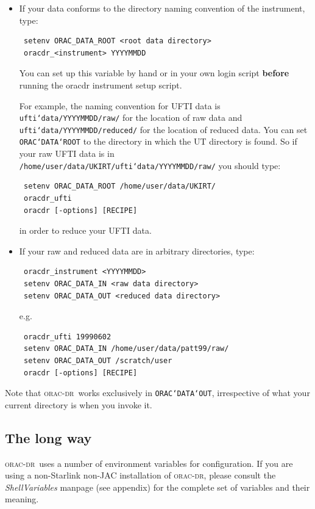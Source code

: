 \documentclass[twoside,11pt]{article}
\renewcommand{\_}{\texttt{\symbol{95}}}
\newcommand{\oracdr}{\textsc{orac-dr}}
\begin{document}
\begin{itemize}

\item
If your data conforms to the directory naming convention of the
instrument, type:
\begin{verbatim}
 setenv ORAC_DATA_ROOT <root data directory>
 oracdr_<instrument> YYYYMMDD
\end{verbatim}

You can set up this variable by hand or in your own login script
{\bf before} running the oracdr instrument setup script.

For example, the naming convention for UFTI data is
{\tt ufti\char`\_data/YYYYMMDD/raw/} for the location of raw data and
{\tt ufti\char`\_data/YYYYMMDD/reduced/} for the location of reduced data. You can
set {\tt ORAC\char`\_DATA\char`\_ROOT} to the directory in which the UT directory is
found. So if your raw UFTI data is in
{\tt /home/user/data/UKIRT/ufti\char`\_data/YYYYMMDD/raw/} you should type:
\begin{verbatim}
 setenv ORAC_DATA_ROOT /home/user/data/UKIRT/
 oracdr_ufti
 oracdr [-options] [RECIPE]
\end{verbatim}

in order to reduce your UFTI data.

\item
If your raw and reduced data are in arbitrary directories, type:
\begin{verbatim}
 oracdr_instrument <YYYYMMDD>
 setenv ORAC_DATA_IN <raw data directory>
 setenv ORAC_DATA_OUT <reduced data directory>
\end{verbatim}

e.g. 
\begin{verbatim}
 oracdr_ufti 19990602
 setenv ORAC_DATA_IN /home/user/data/patt99/raw/
 setenv ORAC_DATA_OUT /scratch/user
 oracdr [-options] [RECIPE]
\end{verbatim}

\end{itemize}

Note that \oracdr\ works exclusively in {\tt ORAC\char`\_DATA\char`\_OUT}, irrespective of
what your current directory is when you invoke it.

\subsection*{The long way}

\oracdr\ uses a number of environment variables for configuration. If
you are using a non-Starlink non-JAC installation of \oracdr, please
consult the {\em ShellVariables\/} manpage (see appendix) for the complete set of
variables and their meaning.
\end{document}
